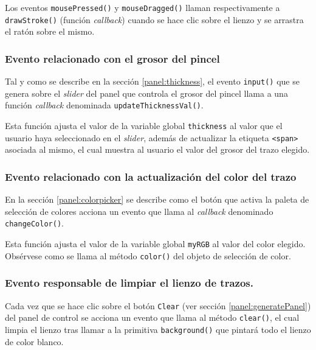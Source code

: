 \documentclass[10pt,a4paper]{report}
\begin{document}
	
	
	Los eventos \texttt{mousePressed()} y \texttt{mouseDragged()} llaman respectivamente a \texttt{drawStroke()} (función \textit{callback}) cuando se hace clic sobre el lienzo y se arrastra el ratón sobre el mismo.
	
	
	
	\subsubsection{Evento relacionado con el grosor del pincel}
	Tal y como se describe en la sección \ref{panel:thickness}, el evento \texttt{input()} que se genera sobre el \textit{slider} del panel que controla el grosor del pincel llama a una función \textit{callback} denominada \texttt{updateThicknessVal()}.
	
	Esta función ajusta el valor de la variable global \texttt{thickness} al valor que el usuario haya seleccionado en el \textit{slider}, además de actualizar la etiqueta \texttt{<span>} asociada al mismo, el cual muestra al usuario el valor del grosor del trazo elegido.
	
	
	
	\subsubsection{Evento relacionado con la actualización del color del trazo}
	En la sección \ref{panel:colorpicker} se describe como el botón que activa la paleta de selección de colores acciona un evento que llama al \textit{callback} denominado \texttt{changeColor()}.
	
	Esta función ajusta el valor de la variable global \texttt{myRGB} al valor del color elegido. Obsérvese como se llama al método \texttt{color()} del objeto de selección de color.
	
	
	
	\subsubsection{Evento responsable de limpiar el lienzo de trazos.}
	Cada vez que se hace clic sobre el botón \texttt{Clear} (ver sección \ref{panel:generatePanel}) del panel de control se acciona un evento que llama al método \texttt{clear()}, el cual limpia el lienzo tras llamar a la primitiva \texttt{background()} que pintará todo el lienzo de color blanco.
	
\end{document}
